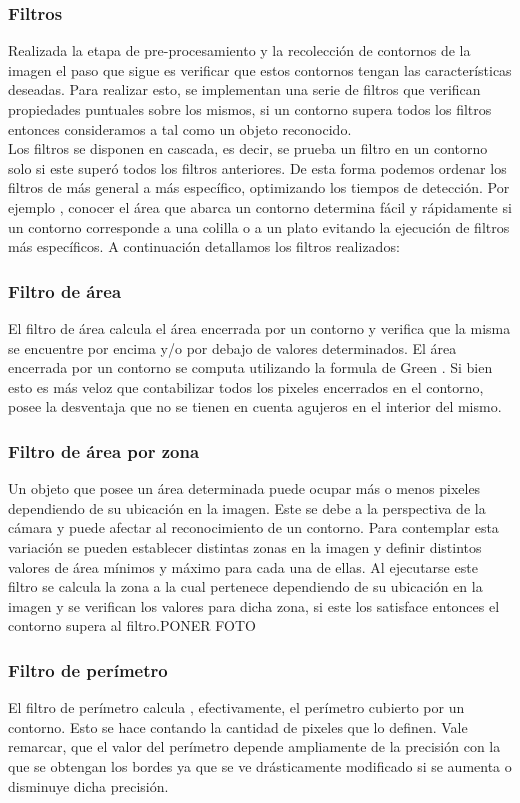 	\subsubsection{Filtros}
	Realizada la etapa de pre-procesamiento y la recolección de contornos de la imagen el paso que sigue es verificar que estos
	contornos tengan las características deseadas. Para realizar esto, se implementan una serie de filtros que verifican propiedades
	puntuales sobre los mismos, si un contorno supera todos los filtros entonces consideramos a tal como un objeto reconocido. \\
	\indent Los filtros se disponen en cascada, es decir, se prueba un filtro en un contorno solo si este superó todos los filtros 
	anteriores. De esta forma podemos ordenar los filtros de más general a más específico, optimizando los tiempos de detección. Por ejemplo , conocer 
	el área que abarca un contorno determina fácil y rápidamente si un contorno corresponde a una colilla o a un plato evitando la ejecución
	de filtros más específicos. A continuación detallamos los filtros realizados:
	\subsubsection*{Filtro de área}
	El filtro de área calcula el área encerrada por un contorno y verifica que la misma se encuentre por encima y/o por debajo
	de valores determinados. El área encerrada por un contorno se computa utilizando la formula de Green \cite{greenwolfram}.
	Si bien esto es más veloz que contabilizar todos los pixeles encerrados en el contorno, posee la desventaja que no se tienen en cuenta agujeros
	en el interior del mismo.
	\subsubsection*{Filtro de área por zona}
	Un objeto que posee un área determinada puede ocupar más o menos pixeles dependiendo de su ubicación en la imagen. Este se debe a la 
	perspectiva de la cámara y puede afectar al reconocimiento de un contorno. Para contemplar esta variación se pueden establecer distintas
	zonas en la imagen y definir distintos valores de área mínimos y máximo para cada una de ellas. Al ejecutarse este filtro se calcula la
	zona a la cual pertenece dependiendo de su ubicación en la imagen y se verifican los valores para dicha zona, si este los satisface entonces
	el contorno supera al filtro.PONER FOTO
	\subsubsection*{Filtro de perímetro}
	El filtro de perímetro calcula , efectivamente, el perímetro cubierto por un contorno. Esto se hace contando la cantidad de pixeles que lo definen.
	Vale remarcar, que el valor del perímetro depende ampliamente de la precisión con la que se obtengan los bordes ya que se ve drásticamente modificado 
	si se aumenta o disminuye dicha precisión.
